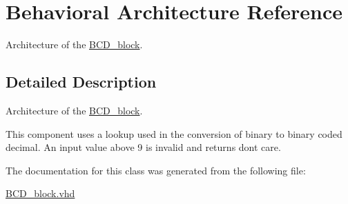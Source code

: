 \hypertarget{classBCD__block_1_1Behavioral}{\section{Behavioral Architecture Reference}
\label{classBCD__block_1_1Behavioral}
}


Architecture of the \hyperlink{classBCD__block}{B\-C\-D\-\_\-block}.  




\subsection{Detailed Description}
Architecture of the \hyperlink{classBCD__block}{B\-C\-D\-\_\-block}. 

This component uses a lookup used in the conversion of binary to binary coded decimal. An input value above 9 is invalid and returns dont care. 

The documentation for this class was generated from the following file\-:\begin{DoxyCompactItemize}
\item 
\hyperlink{BCD__block_8vhd}{B\-C\-D\-\_\-block.\-vhd}\end{DoxyCompactItemize}

